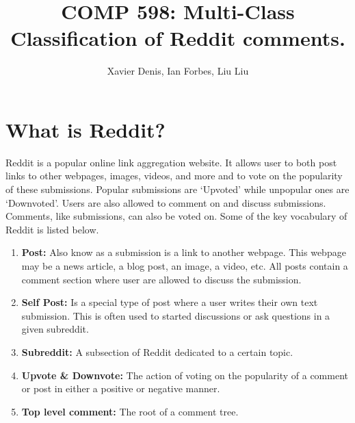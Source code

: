 \documentclass[10pt,twocolumn]{article}
\title {COMP 598: Multi-Class Classification of Reddit comments.}
\author {Xavier Denis, Ian Forbes, Liu Liu}
\begin{document}
\section{What is Reddit?}

Reddit is a popular online link aggregation website. It allows user to both post links to other webpages, images, videos, and more and to vote on the popularity of these submissions. Popular submissions are `Upvoted' while unpopular ones are `Downvoted'. Users are also allowed to comment on and discuss submissions. Comments, like submissions, can also be voted on. Some of the key vocabulary of Reddit is listed below.

\begin {enumerate}
\item \textbf{Post:} Also know as a submission is a link to another webpage. This webpage may be a news article, a blog post, an image, a video, etc. All posts contain a comment section where user are allowed to discuss the submission.
\item \textbf{Self Post:} Is a special type of post where a user writes their own text submission. This is often used to started discussions or ask questions in a given subreddit. 
\item \textbf{Subreddit:} A subsection of Reddit dedicated to a certain topic. 
\item \textbf{Upvote \& Downvote:} The action of voting on the popularity of a comment or post in either a positive or negative manner.
\item \textbf{Top level comment:} The root of a comment tree.
\end {enumerate}
\end{document}
